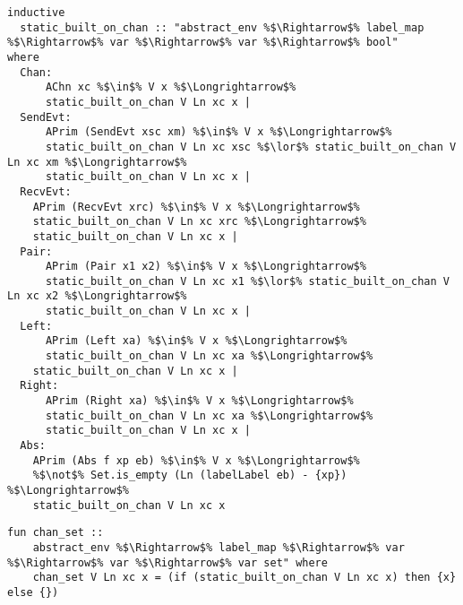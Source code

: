 \begin{lstlisting}[style=codestyle1, escapechar=\%]
inductive 
  static_built_on_chan :: "abstract_env %$\Rightarrow$% label_map %$\Rightarrow$% var %$\Rightarrow$% var %$\Rightarrow$% bool"
where
  Chan:
      AChn xc %$\in$% V x %$\Longrightarrow$% 
      static_built_on_chan V Ln xc x |
  SendEvt: 
      APrim (SendEvt xsc xm) %$\in$% V x %$\Longrightarrow$% 
      static_built_on_chan V Ln xc xsc %$\lor$% static_built_on_chan V Ln xc xm %$\Longrightarrow$% 
      static_built_on_chan V Ln xc x |
  RecvEvt:
    APrim (RecvEvt xrc) %$\in$% V x %$\Longrightarrow$% 
    static_built_on_chan V Ln xc xrc %$\Longrightarrow$% 
    static_built_on_chan V Ln xc x |
  Pair:
      APrim (Pair x1 x2) %$\in$% V x %$\Longrightarrow$%
      static_built_on_chan V Ln xc x1 %$\lor$% static_built_on_chan V Ln xc x2 %$\Longrightarrow$% 
      static_built_on_chan V Ln xc x |
  Left:
      APrim (Left xa) %$\in$% V x %$\Longrightarrow$% 
      static_built_on_chan V Ln xc xa %$\Longrightarrow$% 
    static_built_on_chan V Ln xc x |
  Right:
      APrim (Right xa) %$\in$% V x %$\Longrightarrow$% 
      static_built_on_chan V Ln xc xa %$\Longrightarrow$% 
      static_built_on_chan V Ln xc x |
  Abs:
    APrim (Abs f xp eb) %$\in$% V x %$\Longrightarrow$% 
    %$\not$% Set.is_empty (Ln (labelLabel eb) - {xp}) %$\Longrightarrow$%
    static_built_on_chan V Ln xc x 
  \end{lstlisting}



\begin{lstlisting}[style=codestyle1, escapechar=\%]
  fun chan_set ::
    abstract_env %$\Rightarrow$% label_map %$\Rightarrow$% var %$\Rightarrow$% var %$\Rightarrow$% var set" where
    chan_set V Ln xc x = (if (static_built_on_chan V Ln xc x) then {x} else {})
  \end{lstlisting}


